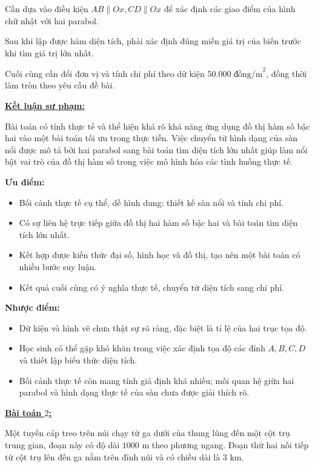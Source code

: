 \documentclass[12pt,a4paper,oneside]{book}
\theoremstyle{theorem}
\theoremstyle{definition}
\begin{document}
Cần dựa vào điều kiện $AB \parallel Ox, CD \parallel Ox$ để xác định các giao điểm của hình chữ nhật với hai parabol.

Sau khi lập được hàm diện tích, phải xác định đúng miền giá trị của biến trước khi tìm giá trị lớn nhất.

Cuối cùng cần đổi đơn vị và tính chi phí theo dữ kiện $50.000\text{ đồng/m}^2$, đồng thời làm tròn theo yêu cầu đề bài.

        \textbf{\underline{Kết luận sư phạm:}}

        Bài toán có tính thực tế và thể hiện khá rõ khả năng ứng dụng đồ thị hàm số bậc hai vào một bài toán tối ưu trong thực tiễn. Việc chuyển từ hình dạng của sàn nổi được mô tả bởi hai parabol sang bài toán tìm diện tích lớn nhất giúp làm nổi bật vai trò của đồ thị hàm số trong việc mô hình hóa các tình huống thực tế.
        
        \textbf{Ưu điểm:}
        \begin{itemize}
            \item Bối cảnh thực tế cụ thể, dễ hình dung: thiết kế sàn nổi và tính chi phí.
            \item Có sự liên hệ trực tiếp giữa đồ thị hai hàm số bậc hai và bài toán tìm diện tích lớn nhất.
            \item Kết hợp được kiến thức đại số, hình học và đồ thị, tạo nên một bài toán có nhiều bước suy luận.
            \item Kết quả cuối cùng có ý nghĩa thực tế, chuyển từ diện tích sang chi phí.
        \end{itemize}
        
        \textbf{Nhược điểm:}
        \begin{itemize}
            \item Dữ kiện và hình vẽ chưa thật sự rõ ràng, đặc biệt là tỉ lệ của hai trục tọa độ.
            \item Học sinh có thể gặp khó khăn trong việc xác định tọa độ các đỉnh $A,B,C,D$ và thiết lập biểu thức diện tích.
            \item Bối cảnh thực tế còn mang tính giả định khá nhiều; mối quan hệ giữa hai parabol và hình dạng thực tế của sàn chưa được giải thích rõ.
        \end{itemize}
        \textbf{\underline{Bài toán $2$:}}

        Một tuyến cáp treo trên núi chạy từ ga dưới của thung lũng đến một cột trụ trung gian, đoạn này có độ dài $1000\text{ m}$ theo phương ngang. Đoạn thứ hai nối tiếp từ cột trụ lên đến ga nằm trên đỉnh núi và có chiều dài là $3\text{ km}$.
\end{document}

